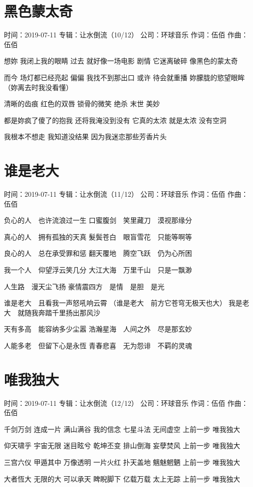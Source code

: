 \documentclass[UTF8,a4paper,oneside,twocolumn,12pt]{ctexbook}
\newcommand{\infopair}[2]{\textbullet #1：#2}
\newcommand{\zc}[1][伍佰]{\infopair{作词}{#1}}
\newcommand{\zq}[1][伍佰]{\infopair{作曲}{#1}}
\newcommand{\zj}[1]{\infopair{专辑}{#1}}
\newcommand{\sj}[1]{\infopair{时间}{#1}}
\newcommand{\gs}[1]{\infopair{公司}{#1}}
\newenvironment{info}{\begin{flushleft}\kaishu
	}
	{\end{flushleft}\normalsize\yahei\par}
\newenvironment{lyric}{
	}
{}
\begin{document}
\section{黑色蒙太奇}
\begin{info}
	\sj{2019-07-11}
	\zj{让水倒流（10/12）}
	\gs{环球音乐}
	\zc
	\zq
\end{info}
\begin{lyric}
	想妳 我闭上我的眼睛
	过去 就好像一场电影
	剧情 它迷离破碎
	像黑色的蒙太奇

	而今 场灯都已经亮起
	偏偏 我找不到那出口
	或许 待会就重播
	妳朦胧的慾望眼眸
	（妳离去时我没看懂）

	清晰的齿痕 红色的双唇 锁骨的微笑
	绝杀 末世 美妙

	都是妳疯了傻了的抱我
	还将我淹没到没有
	它真的太浓 就是太浓
	没有空洞

	我根本不想走
	我知道没结果
	因为我迷恋那些芳香片头
\end{lyric}

\section{谁是老大}
\begin{info}
	\sj{2019-07-11}
	\zj{让水倒流（11/12）}
	\gs{环球音乐}
	\zc
	\zq
\end{info}
\begin{lyric}
	负心的人　也许流浪过一生
	口蜜腹剑　笑里藏刀　漠视那缘分

	真心的人　拥有孤独的天真
	髮鬓苍白　眼盲雪花　只能等啊等

	良心的人　总在承受罪和惩
	翻天覆地　腾空飞跃　仍为心所困

	我一个人　仰望浮云笑几分
	大江大海　万里千山　只是一飘渺

	人生路　漫天尘飞扬
	豪情震四方　是情　是胆　是光

	谁是老大　且看我一声怒吼响云霄
	（谁是老大　前方它苍穹无极天也大）
	我是老大　就随我奔踏千里扬出那风沙

	天有多高　能容纳多少尘嚣
	浩瀚星海　人间之外　尽是那玄妙

	人能多老　但留下心是永恆
	青春悲喜　无为怨诽　不羁的灵魂
\end{lyric}

\section{唯我独大}
\begin{info}
	\sj{2019-07-11}
	\zj{让水倒流（12/12）}
	\gs{环球音乐}
	\zc
	\zq
\end{info}
\begin{lyric}
	千剑万剑 连成一片
	满山满谷 我的信念
	七星斗法 无间虚空
	上前一步 唯我独大

	仰天啸乎 宇宙无限
	迷目眩兮 乾坤丕变
	排山倒海 妄孽焚风
	上前一步 唯我独大

	三宫六仪 甲遁其中
	万像透明 一片火红
	扑天盖地 魑魅魍魉
	上前一步 唯我独大

	大者恆大 无限的大
	可以承天 睥睨脚下
	亿载万载 太上无踪
	上前一步 唯我独大
\end{lyric}
\end{document}
